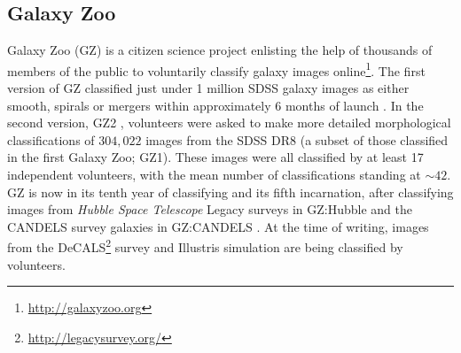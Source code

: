 \subsection{Galaxy Zoo}\label{sec:GZ}

Galaxy Zoo (GZ) is a citizen science project enlisting the help of thousands of members of the public to voluntarily classify galaxy images online\footnote{\url{http://galaxyzoo.org}}. The first version of GZ classified just under 1 million SDSS galaxy images as either smooth, spirals or mergers within approximately 6 months of launch \citep{lintott08, Lintott11}. In the second version, GZ2 \citep{GZ2}, volunteers were asked to make more detailed morphological classifications of $304, 022$ images from the SDSS DR8 (a subset of those classified in the first Galaxy Zoo; GZ1). These images were all classified by at least 17 independent volunteers, with the mean number of classifications standing at $\sim42$. GZ is now in its tenth year of classifying and its fifth incarnation, after classifying images from \emph{Hubble Space Telescope} Legacy surveys in GZ:Hubble \citep{willett16} and the CANDELS survey galaxies in GZ:CANDELS \citep{simmons16}. At the time of writing, images from the DeCALS\footnote{\url{http://legacysurvey.org/}} survey and Illustris simulation \citep{vogelsberger14, genel14} are being classified by volunteers. 

